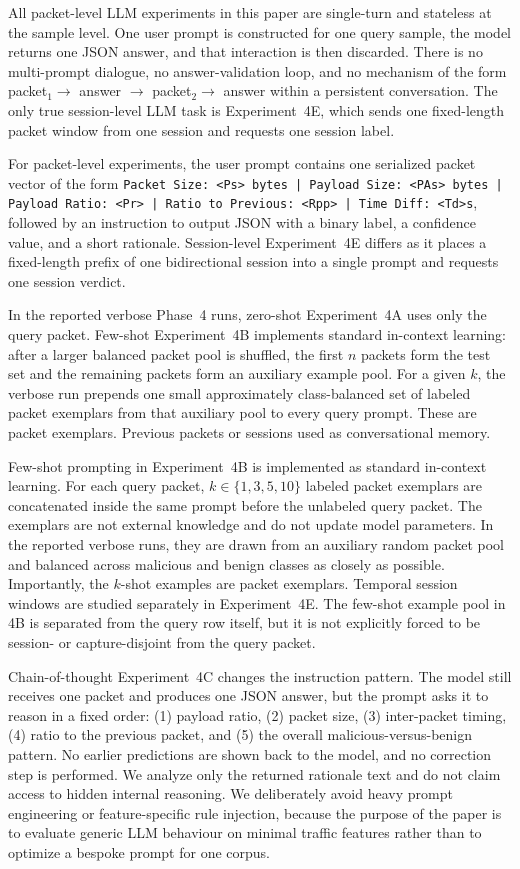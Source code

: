 \documentclass[conference]{IEEEtran}
\begin{document}
All packet-level LLM experiments in this paper are single-turn and stateless at the sample level. One user prompt is constructed for one query sample, the model returns one JSON answer, and that interaction is then discarded. There is no multi-prompt dialogue, no answer-validation loop, and no mechanism of the form packet$_1 \rightarrow$ answer $\rightarrow$ packet$_2 \rightarrow$ answer within a persistent conversation. The only true session-level LLM task is Experiment~4E, which sends one fixed-length packet window from one session and requests one session label.

For packet-level experiments, the user prompt contains one serialized packet vector of the form \texttt{Packet Size: <Ps> bytes | Payload Size: <PAs> bytes | Payload Ratio: <Pr> | Ratio to Previous: <Rpp> | Time Diff: <Td>s}, followed by an instruction to output JSON with a binary label, a confidence value, and a short rationale. Session-level Experiment~4E differs as it places a fixed-length prefix of one bidirectional session into a single prompt and requests one session verdict. 

In the reported verbose Phase~4 runs, zero-shot Experiment~4A uses only the query packet. Few-shot Experiment~4B implements standard in-context learning: after a larger balanced packet pool is shuffled, the first $n$ packets form the test set and the remaining packets form an auxiliary example pool. For a given $k$, the verbose run prepends one small approximately class-balanced set of labeled packet exemplars from that auxiliary pool to every query prompt. These are packet exemplars. Previous packets or sessions used as conversational memory.

Few-shot prompting in Experiment~4B is implemented as standard in-context learning. For each query packet, $k \in \{1,3,5,10\}$ labeled packet exemplars are concatenated inside the same prompt before the unlabeled query packet. The exemplars are not external knowledge and do not update model parameters. In the reported verbose runs, they are drawn from an auxiliary random packet pool and balanced across malicious and benign classes as closely as possible. Importantly, the $k$-shot examples are packet exemplars. Temporal session windows are studied separately in Experiment~4E.  The few-shot example pool in 4B is separated from the query row itself, but it is not explicitly forced to be session- or capture-disjoint from the query packet. 

Chain-of-thought Experiment~4C changes the instruction pattern. The model still receives one packet and produces one JSON answer, but the prompt asks it to reason in a fixed order: (1) payload ratio, (2) packet size, (3) inter-packet timing, (4) ratio to the previous packet, and (5) the overall malicious-versus-benign pattern. No earlier predictions are shown back to the model, and no correction step is performed. We analyze only the returned rationale text and do not claim access to hidden internal reasoning. We deliberately avoid heavy prompt engineering or feature-specific rule injection, because the purpose of the paper is to evaluate generic LLM behaviour on minimal traffic features rather than to optimize a bespoke prompt for one corpus.
\end{document}
